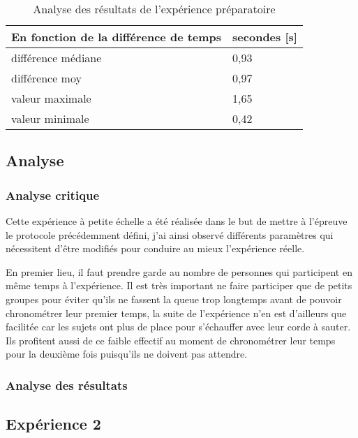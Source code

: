 \documentclass[12pt,fleqn,oneside,openany]{book} %
\begin{document}
\begin{table}[h]
	\centering
	\caption{Analyse des résultats de l'expérience préparatoire} \label{tbl:analyse2.1P}
	\begin{tabular}{ll}
		\toprule 
		\textbf{En fonction de la différence de temps} & \textbf{secondes [s]} \\ \midrule
		différence médiane & 0,93 \\
		différence moy & 0,97 \\
		valeur maximale & 1,65 \\
		valeur minimale & 0,42 \\ \bottomrule
	\end{tabular}
\end{table}

\subsection{Analyse} \label{ssec:analyse2.1}

\subsubsection{Analyse critique} \label{sssec:analyseCrit2.1}
Cette expérience à petite échelle a été réalisée dans le but de mettre à l'épreuve le protocole précédemment défini, j'ai ainsi observé différents paramètres qui nécessitent d'être modifiés pour conduire au mieux l'expérience réelle. 

En premier lieu, il faut prendre garde au nombre de personnes qui participent en même temps à l'expérience. Il est très important ne faire participer que de petits groupes pour éviter qu'ils ne fassent la queue trop longtemps avant de pouvoir chronométrer leur premier temps, la suite de l'expérience n'en est d'ailleurs que facilitée car les sujets ont plus de place pour s'échauffer avec leur corde à sauter. Ils profitent aussi de ce faible effectif au moment de chronométrer leur temps pour la deuxième fois puisqu'ils ne doivent pas attendre.

\subsubsection{Analyse des résultats} \label{sssec:analyseResult2.1}

\subsection{Expérience 2} \label{ssec:but2.2}
\end{document}
